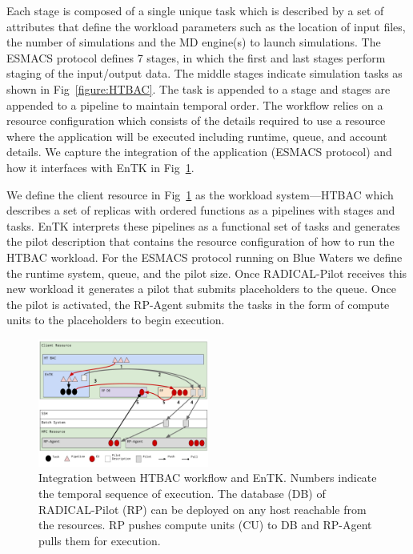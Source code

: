 Each stage is composed of a single unique task which is described by a set of
attributes that define the workload parameters such as the location of input
files, the number of simulations and the MD engine(s) to launch simulations.
The ESMACS protocol defines 7 stages, in which the first and last
stages perform staging of the input/output data. The middle stages indicate
simulation tasks as shown in Fig~\ref{figure:HTBAC}. The task is
appended to a stage and stages are appended to a pipeline to maintain
temporal order. The workflow relies on a resource configuration which
consists of the details required to use a resource where the application will
be executed including runtime, queue, and account details. We capture the
integration of the application (ESMACS protocol) and how it interfaces with
EnTK in Fig~\ref{figure:ht-bac_rp}.



We define the client resource in Fig~\ref{figure:ht-bac_rp} as the workload
system---HTBAC which describes a set of replicas with ordered functions as
a pipelines with stages and tasks. EnTK interprets these pipelines as a
functional set of tasks and generates the pilot description that contains the
resource configuration of how to run the HTBAC workload. For the ESMACS
protocol running on Blue Waters we define the runtime system, queue, and the
pilot size. Once RADICAL-Pilot receives this new workload it generates a
pilot that submits placeholders to the queue. Once the pilot is activated,
the RP-Agent submits the tasks in the form of compute units to the
placeholders to begin execution.


\begin{figure}
\centering
  \includegraphics[width=0.5\textwidth]{FIGURES/ht-bac-rp_integration.pdf}
  \caption{Integration between HTBAC workflow and EnTK\@. Numbers
  indicate the temporal sequence of execution. The database (DB) of
  RADICAL-Pilot (RP) can be deployed on any host reachable from the
  resources. RP pushes compute units (CU) to DB and RP-Agent pulls them for
  execution. }\label{figure:ht-bac_rp}
\end{figure}


